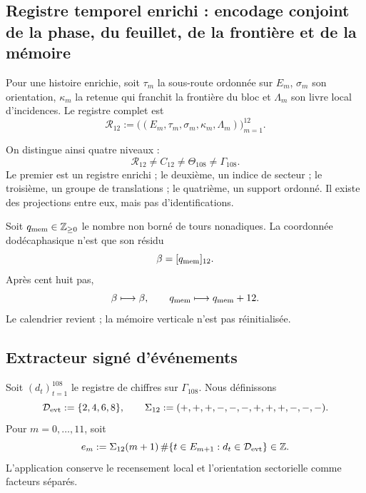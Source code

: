 {\subsection{Registre temporel enrichi : encodage conjoint de la phase, du feuillet, de la frontière et de la mémoire}

\begin{definition}
\label{p12-83-c1-s9:def:u006d-registro-dodecafasico}
Pour une histoire enrichie, soit \(\tau_m\) la sous-route ordonnée sur
\(E_m\), \(\sigma_m\) son orientation, \(\kappa_m\) la retenue qui franchit la
frontière du bloc et \(\Lambda_m\) son livre local d’incidences. Le
registre complet est
\begin{equation}
 \mathcal R_{12}:=
 \bigl(
 (E_m,\tau_m,\sigma_m,\kappa_m,\Lambda_m)
 \bigr)_{m=1}^{12}.
 \label{p12-83-c1-s9:eq:u006d-registro-r12}
\end{equation}
\end{definition}

On distingue ainsi quatre niveaux :
\begin{equation}
 \boxed{
 \mathcal R_{12}
 \neq C_{12}
 \neq\Theta_{108}
 \neq\Gamma_{108}.}
 \label{p12-83-c1-s9:eq:u006d-cuatro-objetos}
\end{equation}
Le premier est un registre enrichi ; le deuxième, un indice de secteur ; le
troisième, un groupe de translations ; le quatrième, un support ordonné. Il existe
des projections entre eux, mais pas d’identifications.

Soit \(q_{\rm mem}\in\mathbb Z_{\geq0}\) le nombre non borné de tours
nonadiques. La coordonnée dodécaphasique n’est que son résidu
\[
 \beta=[q_{\rm mem}]_{12}.
\]
Après cent huit pas,
\[
 \beta\longmapsto\beta,
 \qquad
 q_{\rm mem}\longmapsto q_{\rm mem}+12.
\]
Le calendrier revient ; la mémoire verticale n’est pas réinitialisée.

\subsection{Extracteur signé d’événements}

Soit \((d_t)_{t=1}^{108}\) le registre de chiffres sur
\(\Gamma_{108}\). Nous définissons
\begin{equation}
 \mathcal D_{\rm evt}:=\{2,4,6,8\},
 \qquad
 \Sigma_{12}:=(+,+,+,-,-,-,+,+,+,-,-,-).
 \label{p12-83-c1-s9:eq:u006d-datos-eventos}
\end{equation}
Pour \(m=0,\ldots,11\), soit
\begin{equation}
 e_m:=
 \Sigma_{12}(m+1)\,
 \#\{t\in E_{m+1}:d_t\in\mathcal D_{\rm evt}\}
 \in\mathbb Z.
 \label{p12-83-c1-s9:eq:u006d-eventos-firmados}
\end{equation}
L’application conserve le recensement local et l’orientation sectorielle comme
facteurs séparés.

}
